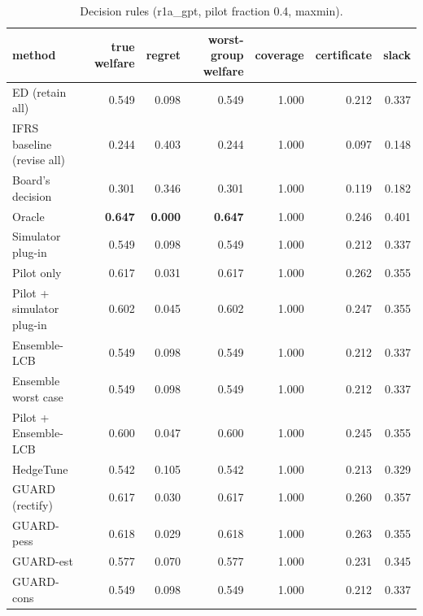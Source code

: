 \begin{table}[t]
\centering
\small
\begin{tabular}{lrrrrrr}
\toprule
method & true welfare & regret & worst-group welfare & coverage & certificate & slack \\
\midrule
ED (retain all) & 0.549 & 0.098 & 0.549 & 1.000 & 0.212 & 0.337 \\
IFRS baseline (revise all) & 0.244 & 0.403 & 0.244 & 1.000 & 0.097 & 0.148 \\
Board's decision & 0.301 & 0.346 & 0.301 & 1.000 & 0.119 & 0.182 \\
Oracle & \textbf{0.647} & \textbf{0.000} & \textbf{0.647} & 1.000 & 0.246 & 0.401 \\
Simulator plug-in & 0.549 & 0.098 & 0.549 & 1.000 & 0.212 & 0.337 \\
Pilot only & 0.617 & 0.031 & 0.617 & 1.000 & 0.262 & 0.355 \\
Pilot + simulator plug-in & 0.602 & 0.045 & 0.602 & 1.000 & 0.247 & 0.355 \\
Ensemble-LCB & 0.549 & 0.098 & 0.549 & 1.000 & 0.212 & 0.337 \\
Ensemble worst case & 0.549 & 0.098 & 0.549 & 1.000 & 0.212 & 0.337 \\
Pilot + Ensemble-LCB & 0.600 & 0.047 & 0.600 & 1.000 & 0.245 & 0.355 \\
HedgeTune & 0.542 & 0.105 & 0.542 & 1.000 & 0.213 & 0.329 \\
GUARD (rectify) & 0.617 & 0.030 & 0.617 & 1.000 & 0.260 & 0.357 \\
GUARD-pess & 0.618 & 0.029 & 0.618 & 1.000 & 0.263 & 0.355 \\
GUARD-est & 0.577 & 0.070 & 0.577 & 1.000 & 0.231 & 0.345 \\
GUARD-cons & 0.549 & 0.098 & 0.549 & 1.000 & 0.212 & 0.337 \\
\bottomrule
\end{tabular}
\caption{Decision rules (r1a\_gpt, pilot fraction 0.4, maxmin).}
\label{tab:methods-maxmin}
\end{table}
